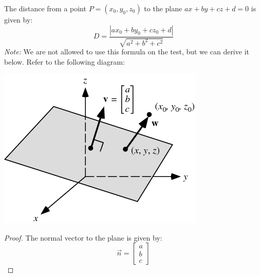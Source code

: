 \documentclass{article}
\begin{document}
\begin{idea}
    The distance from a point $P=(x_0,y_0,z_0)$ to the plane $ax+by+cz+d=0$ is given by:
    \begin{equation}
        D = \frac{|ax_0+by_0+cz_0+d|}{\sqrt{a^2+b^2+c^2}}
        \label{eq:}
    \end{equation}
    \textit{Note:} We are not allowed to use this formula on the test, but we can derive it below. Refer to the following diagram:
\begin{center}
    \includegraphics[width=0.4\linewidth]{plane-point.png}
\end{center}
    \begin{proof}
        The normal vector to the plane is given by:
        \begin{equation}
            \vec{n}=\begin{bmatrix}
                a\\b\\c
            \end{bmatrix}
            \label{eq:}
        \end{equation}
        

\end{proof}
\end{idea}
\end{document}
